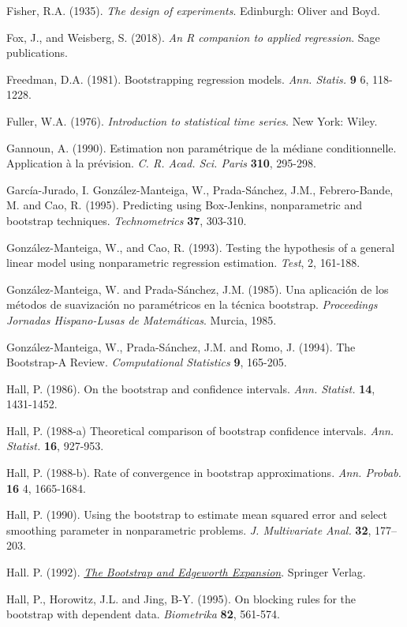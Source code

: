 \documentclass[]{book}
\theoremstyle{break}
\theoremstyle{definition}
\theoremstyle{definition}
\theoremstyle{definition}
\theoremstyle{remark}
\begin{document}
Fisher, R.A. (1935). \emph{The design of experiments}. Edinburgh: Oliver
and Boyd.

Fox, J., and Weisberg, S. (2018). \emph{An R companion to applied
regression}. Sage publications.

Freedman, D.A. (1981). Bootstrapping regression models. \emph{Ann.
Statis.} \textbf{9} 6, 118-1228.

Fuller, W.A. (1976). \emph{Introduction to statistical time series}. New
York: Wiley.

Gannoun, A. (1990). Estimation non paramétrique de la médiane
conditionnelle. Application à la prévision. \emph{C. R. Acad. Sci.
Paris} \textbf{310}, 295-298.

García-Jurado, I. González-Manteiga, W., Prada-Sánchez, J.M.,
Febrero-Bande, M. and Cao, R. (1995). Predicting using Box-Jenkins,
nonparametric and bootstrap techniques. \emph{Technometrics}
\textbf{37}, 303-310.

González-Manteiga, W., and Cao, R. (1993). Testing the hypothesis of a
general linear model using nonparametric regression estimation.
\emph{Test}, 2, 161-188.

González-Manteiga, W. and Prada-Sánchez, J.M. (1985). Una aplicación de
los métodos de suavización no paramétricos en la técnica bootstrap.
\emph{Proceedings Jornadas Hispano-Lusas de Matemáticas}. Murcia, 1985.

González-Manteiga, W., Prada-Sánchez, J.M. and Romo, J. (1994). The
Bootstrap-A Review. \emph{Computational Statistics} \textbf{9}, 165-205.

Hall, P. (1986). On the bootstrap and confidence intervals. \emph{Ann.
Statist.} \textbf{14}, 1431-1452.

Hall, P. (1988-a) Theoretical comparison of bootstrap confidence
intervals. \emph{Ann. Statist.} \textbf{16}, 927-953.

Hall, P. (1988-b). Rate of convergence in bootstrap approximations.
\emph{Ann. Probab.} \textbf{16} 4, 1665-1684.

Hall, P. (1990). Using the bootstrap to estimate mean squared error and
select smoothing parameter in nonparametric problems. \emph{J.
Multivariate Anal.} \textbf{32}, 177--203.

Hall. P. (1992).
\href{https://books.google.es/books?hl=es\&lr=\&id=CwLaBwAAQBAJ\&oi=fnd\&pg=PR11\&dq=The+Bootstrap+and+Edgeworth+Expansion}{\emph{The
Bootstrap and Edgeworth Expansion}}. Springer Verlag.

Hall, P., Horowitz, J.L. and Jing, B-Y. (1995). On blocking rules for
the bootstrap with dependent data. \emph{Biometrika} \textbf{82},
561-574.
\end{document}

